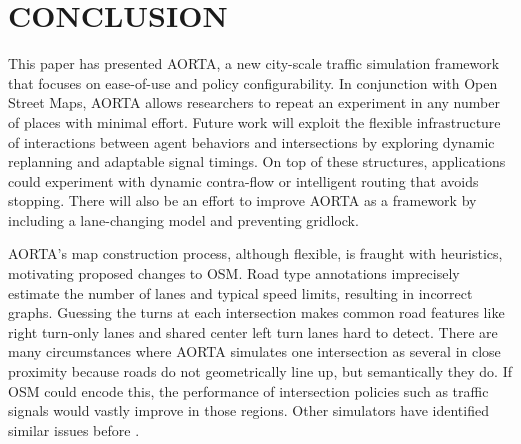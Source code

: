 \documentclass[letterpaper, 10 pt, conference]{ieeeconf}  %
\begin{document}

\section{CONCLUSION}
\label{sec:conclusion}

This paper has presented AORTA, a new city-scale traffic simulation framework
that focuses on ease-of-use and policy configurability. In conjunction with Open
Street Maps, AORTA allows researchers to repeat an experiment in any number of
places with minimal effort. Future work will exploit the flexible infrastructure
of interactions between agent behaviors and intersections by exploring dynamic
replanning and adaptable signal timings. On top of these structures,
applications could experiment with dynamic contra-flow \cite{ITSC11-hausknecht}
or intelligent routing that avoids stopping. There will also be an effort to
improve AORTA as a framework by including a lane-changing model and preventing
gridlock. 

AORTA's map construction process, although flexible, is fraught with heuristics,
motivating proposed changes to OSM. Road type annotations imprecisely estimate
the number of lanes and typical speed limits, resulting in incorrect graphs.
Guessing the turns at each intersection makes common road features like right
turn-only lanes and shared center left turn lanes hard to detect. There are many
circumstances where AORTA simulates one intersection as several in close
proximity because roads do not geometrically line up, but semantically they do.
If OSM could encode this, the performance of intersection policies such as
traffic signals would vastly improve in those regions. Other simulators have
identified similar issues before \cite{Krajzewicz_Hertkorn_Ringel_Wagner_2005}.


\addtolength{\textheight}{-12cm}  %
\end{document}
